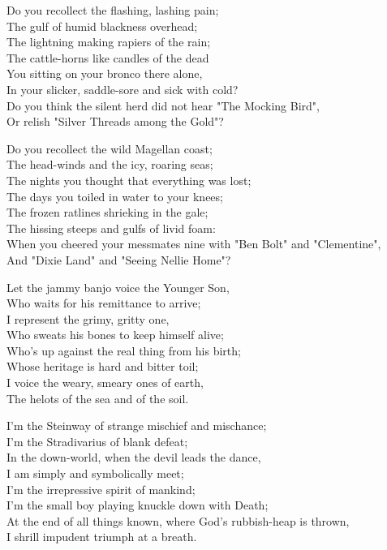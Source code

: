 \begin{poemblock}
Do you recollect the flashing, lashing pain;\\
\idt The gulf of humid blackness overhead;\\
The lightning making rapiers of the rain;\\
\idt The cattle-horns like candles of the dead\\
You sitting on your bronco there alone,\\
\idt In your slicker, saddle-sore and sick with cold?\\
Do you think the silent herd did not hear "The Mocking Bird",\\
\idt Or relish "Silver Threads among the Gold"?

Do you recollect the wild Magellan coast;\\
\idt The head-winds and the icy, roaring seas;\\
The nights you thought that everything was lost;\\
\idt The days you toiled in water to your knees;\\
The frozen ratlines shrieking in the gale;\\
\idt The hissing steeps and gulfs of livid foam:\\
When you cheered your messmates nine with "Ben Bolt" and "Clementine",\\
\idt And "Dixie Land" and "Seeing Nellie Home"?

Let the jammy banjo voice the Younger Son,\\
\idt Who waits for his remittance to arrive;\\
I represent the grimy, gritty one,\\
\idt Who sweats his bones to keep himself alive;\\
Who's up against the real thing from his birth;\\
\idt Whose heritage is hard and bitter toil;\\
I voice the weary, smeary ones of earth,\\
\idt The helots of the sea and of the soil.

I'm the Steinway of strange mischief and mischance;\\
\idt I'm the Stradivarius of blank defeat;\\
In the down-world, when the devil leads the dance,\\
\idt I am simply and symbolically meet;\\
I'm the irrepressive spirit of mankind;\\
\idt I'm the small boy playing knuckle down with Death;\\
At the end of all things known, where God's rubbish-heap is thrown,\\
\idt I shrill impudent triumph at a breath.


\end{poemblock}

